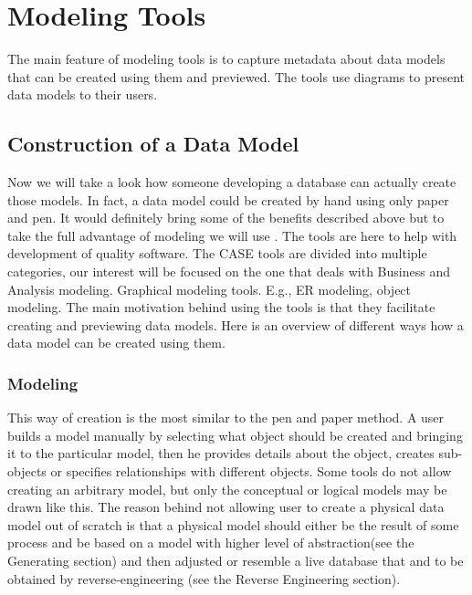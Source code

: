\chapter{Modeling Tools}

The main feature of modeling tools is to capture metadata about data models that can be created using them and previewed. The tools use diagrams to present data models to their users.

\section{Construction of a Data Model}

Now we will take a look how someone developing a database can actually create those models.
In fact, a data model could be created by hand using only paper and pen. It would definitely bring some of the benefits described above but to take the full advantage of modeling we will use . The tools are here to help with development of quality software. The CASE tools are divided into multiple categories, our interest will be focused on the one that deals with Business and Analysis modeling. Graphical modeling tools. E.g., ER modeling, object modeling.
The main motivation behind using the tools is that they facilitate creating and previewing data models. Here is an overview of different ways how a data model can be created using them.

\subsection{Modeling}

This way of creation is the most similar to the pen and paper method. A user builds a model manually by selecting what object should be created and bringing it to the particular model, then he provides details about the object, creates sub-objects or specifies relationships with different objects.
Some tools do not allow creating an arbitrary model, but only the conceptual or logical models may be drawn like this. 
The reason behind not allowing user to create a physical data model out of scratch is that a physical model should either be the result of some process and be based on a model with higher level of abstraction(see the Generating section) and then adjusted or resemble a live database that and to be obtained by reverse-engineering (see the Reverse Engineering section).

